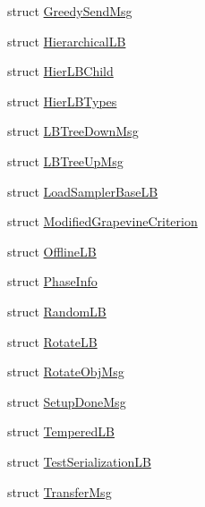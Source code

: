 \begin{DoxyCompactItemize}
struct \hyperlink{structvt_1_1vrt_1_1collection_1_1lb_1_1_greedy_send_msg}{Greedy\+Send\+Msg}
\item 
struct \hyperlink{structvt_1_1vrt_1_1collection_1_1lb_1_1_hierarchical_l_b}{Hierarchical\+LB}
\item 
struct \hyperlink{structvt_1_1vrt_1_1collection_1_1lb_1_1_hier_l_b_child}{Hier\+L\+B\+Child}
\item 
struct \hyperlink{structvt_1_1vrt_1_1collection_1_1lb_1_1_hier_l_b_types}{Hier\+L\+B\+Types}
\item 
struct \hyperlink{structvt_1_1vrt_1_1collection_1_1lb_1_1_l_b_tree_down_msg}{L\+B\+Tree\+Down\+Msg}
\item 
struct \hyperlink{structvt_1_1vrt_1_1collection_1_1lb_1_1_l_b_tree_up_msg}{L\+B\+Tree\+Up\+Msg}
\item 
struct \hyperlink{structvt_1_1vrt_1_1collection_1_1lb_1_1_load_sampler_base_l_b}{Load\+Sampler\+Base\+LB}
\item 
struct \hyperlink{structvt_1_1vrt_1_1collection_1_1lb_1_1_modified_grapevine_criterion}{Modified\+Grapevine\+Criterion}
\item 
struct \hyperlink{structvt_1_1vrt_1_1collection_1_1lb_1_1_offline_l_b}{Offline\+LB}
\item 
struct \hyperlink{structvt_1_1vrt_1_1collection_1_1lb_1_1_phase_info}{Phase\+Info}
\item 
struct \hyperlink{structvt_1_1vrt_1_1collection_1_1lb_1_1_random_l_b}{Random\+LB}
\item 
struct \hyperlink{structvt_1_1vrt_1_1collection_1_1lb_1_1_rotate_l_b}{Rotate\+LB}
\item 
struct \hyperlink{structvt_1_1vrt_1_1collection_1_1lb_1_1_rotate_obj_msg}{Rotate\+Obj\+Msg}
\item 
struct \hyperlink{structvt_1_1vrt_1_1collection_1_1lb_1_1_setup_done_msg}{Setup\+Done\+Msg}
\item 
struct \hyperlink{structvt_1_1vrt_1_1collection_1_1lb_1_1_tempered_l_b}{Tempered\+LB}
\item 
struct \hyperlink{structvt_1_1vrt_1_1collection_1_1lb_1_1_test_serialization_l_b}{Test\+Serialization\+LB}
\item 
struct \hyperlink{structvt_1_1vrt_1_1collection_1_1lb_1_1_transfer_msg}{Transfer\+Msg}
\end{DoxyCompactItemize}
